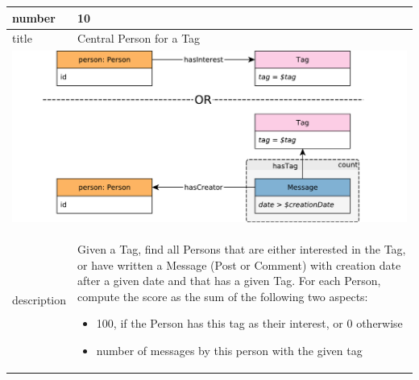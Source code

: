 \renewcommand*{\arraystretch}{1.1}

\noindent\begin{tabularx}{17cm}{|p{1.95cm}|X|}
	\hline
	number      & 10                                                          \\ \hline
%
	title       & Central Person for a Tag                                                           \\ \hline
	\multicolumn{2}{|c|}{ \includegraphics[scale=\patternscale,margin=0cm .2cm]{patterns/q10}} \\ \hline
	description & Given a Tag, find all Persons that are either interested in the Tag, or
have written a Message (Post or Comment) with creation date after a
given date and that has a given Tag. For each Person, compute the score
as the sum of the following two aspects:

\begin{itemize}
\tightlist
\item
  100, if the Person has this tag as their interest, or 0 otherwise
\item
  number of messages by this person with the given tag
\end{itemize}
 \\ \hline
	

\end{tabularx}
